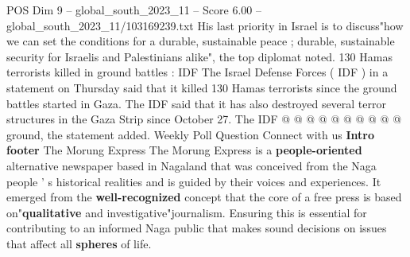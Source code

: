 \begin{textsample}{POS Dim 9 – global\_south\_2023\_11 – Score 6.00 – global\_south\_2023\_11/103169239.txt}
His last priority in Israel is to discuss"how we can set the conditions for a durable, sustainable peace ; durable, sustainable security for Israelis and Palestinians alike", the top diplomat noted. 130 Hamas terrorists killed in ground battles : IDF The Israel Defense Forces ( IDF ) in a statement on Thursday said that it killed 130 Hamas terrorists since the ground battles started in Gaza.
The IDF said that it has also destroyed several terror structures in the Gaza Strip since October 27.
The IDF @ @ @ @ @ @ @ @ @ @ ground, the statement added.
Weekly Poll Question Connect with us \textbf{Intro} \textbf{footer} The Morung Express The Morung Express is a \textbf{people-oriented} alternative newspaper based in Nagaland that was conceived from the Naga people ' s historical realities and is guided by their voices and experiences.
It emerged from the \textbf{well-recognized} concept that the core of a free press is based on"\textbf{qualitative} and investigative"journalism.
Ensuring this is essential for contributing to an informed Naga public that makes sound decisions on issues that affect all \textbf{spheres} of life.

\end{textsample}
